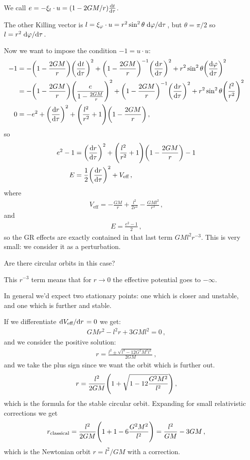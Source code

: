 \documentclass[main.tex]{subfiles}
\begin{document}
We call \(e = - \xi_t \cdot u = (1 - 2GM/r) \dv{t}{\tau }\).

The other Killing vector is \(l = \xi_\varphi \cdot u  =  r^2 \sin^2 \theta \dv*{\varphi }{\tau }\), but \(\theta = \pi /2\) so \(l = r^2 \dv*{\varphi }{\tau }\). 

Now we want to impose the condition \(-1 = u \cdot u\): 
%
\begin{align}
  -1 &=
  - \qty(1 - \frac{2GM}{r}) \qty(\dv[]{t}{\tau })^2
  + \qty(1 - \frac{2GM}{r})^{-1} \qty(\dv[]{r}{\tau })^2
  + r^2 \sin^2 \theta \qty(\dv{\varphi }{\tau })^2  \\
  &=
  - \qty(1 - \frac{2GM}{r}) \qty(\frac{e}{1 - \frac{2GM}{r}})^2
  + \qty(1 - \frac{2GM}{r})^{-1} \qty(\dv[]{r}{\tau })^2
  + r^2 \sin^2 \theta \qty(\frac{l^2}{r^2})^2  \\
  0&= - e^2 + \qty(\dv{r}{\tau })^2
  + \qty(\frac{l^2}{r^2}+1) \qty(1 - \frac{2GM}{r})
\,,
\end{align}
%
so 
%
\begin{align}
  e^2-1 &= \qty(\dv{r}{\tau })^2 + \qty(\frac{l^2}{r^2} +1)
  \qty(1 - \frac{2GM}{r}) - 1 \\
  E &=  \frac{1}{2} \qty(\dv{r}{\tau })^2
  + V _{\text{eff}}
\,,
\end{align}
%
where 
%
\begin{align}
  V_{\text{eff}} = - \frac{GM}{r} + \frac{l^2}{2 r^2} - \frac{GMl^2}{r^3}
\,,
\end{align}
%
and 
%
\begin{align}
  E = \frac{e^2-1}{2}
\,,
\end{align}
%
so the GR effects are exactly contained in that last term \(GMl^2r^{-3}\). This is very small: we consider it as a perturbation.

Are there circular orbits in this case? 

This \(r^{-3}\) term means that for \(r \rightarrow 0\) the effective potential goes to \(- \infty\).

In general we'd expect two stationary points: one which is closer and unstable, and one which is further and stable.

If we differentiate \(\dv*{V _{\text{eff}}}{r}= 0\) we get: 
%
\begin{align}
  GM r^2 - l^2 r + 3GM l^2 = 0
\,,
\end{align}
%
and we consider the positive solution: 
%
\begin{align}
  r= \frac{l^2 \pm \sqrt{l^4 - 12 G^2M^2l^2}}{2GM}
\,,
\end{align}
%
and we take the plus sign since we want the orbit which is further out. 
%
\begin{align}
  r = \frac{l^2}{2GM} \qty(1 + \sqrt{1 - 12 \frac{G^2M^2}{l^2}})
\,,
\end{align}
%
which is the formula for the stable circular orbit.
Expanding for small relativistic corrections we get 
%
\begin{align}
  r _{\text{classical}} = \frac{l^2}{2GM} \qty(1+1-6 \frac{G^2M^2}{l^2}) = \frac{l^2}{GM} - 3GM
\,,
\end{align}
%
which is the Newtonian orbit \(r = l^2/GM\) with a correction.
\end{document}
